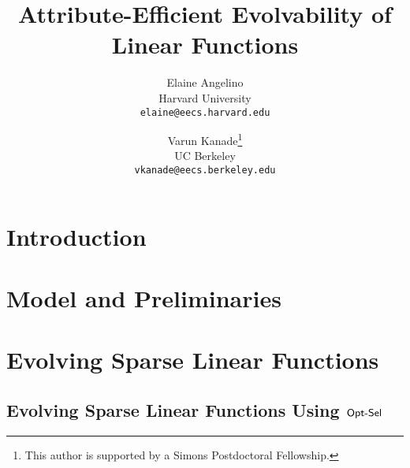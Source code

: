 \documentclass[11pt]{article}
\begin{document}
\title{Attribute-Efficient Evolvability of Linear Functions} 
\author{Elaine Angelino \\
Harvard University \\ \texttt{elaine@eecs.harvard.edu} \and Varun
Kanade\thanks{This author is supported by a Simons Postdoctoral Fellowship.} \\
UC Berkeley \\ \texttt{vkanade@eecs.berkeley.edu}}

\maketitle

\begin{abstract}

\end{abstract}

\newpage

\section{Introduction}
\label{sec:introduction}


\section{Model and Preliminaries}
\label{sec:notation}


\section{Evolving Sparse Linear Functions}
\label{sec:algorithms}


\subsection{Evolving Sparse Linear Functions Using $\mathsf{Opt\mbox{-}Sel}$}
\label{sec:greedy}


% 
% 
% 
\end{document}

